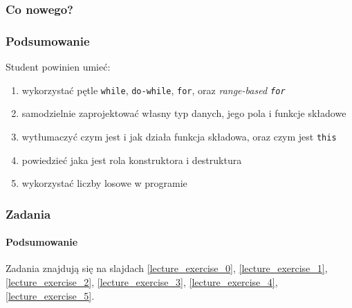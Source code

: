 \documentclass[aspectratio=169]{beamer}
\begin{document}
\begin{frame}
    \frametitle{Co nowego?}
    \frametitle{Podsumowanie}

    Student powinien umieć:

    \begin{enumerate}
        \item wykorzystać pętle {\tt while}, {\tt do-while}, {\tt for}, oraz
            \emph{range-based {\tt for}}
        \item samodzielnie zaprojektować własny typ danych, jego pola i funkcje
            składowe
        \item wytłumaczyć czym jest i jak działa funkcja składowa, oraz czym
            jest {\tt this}
        \item powiedzieć jaka jest rola konstruktora i destruktura
        \item wykorzystać liczby losowe w programie
    \end{enumerate}
\end{frame}

\begin{frame}
    \frametitle{Zadania}
    \framesubtitle{Podsumowanie}

    Zadania znajdują się na slajdach
    \ref{lecture_exercise_0},
    \ref{lecture_exercise_1},
    \ref{lecture_exercise_2},
    \ref{lecture_exercise_3},
    \ref{lecture_exercise_4},
    \ref{lecture_exercise_5}.
\end{frame}
\end{document}

